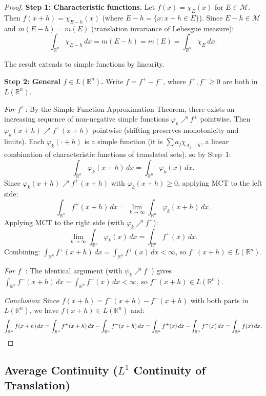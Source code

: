 \documentclass[11pt]{report}
\begin{document}
\begin{proof}
\textbf{Step 1: Characteristic functions.} Let $f(x) = \chi_E(x)$ for $E \in \mathcal{M}$. Then $f(x + h) = \chi_{E-h}(x)$ (where $E - h = \{x : x + h \in E\}$). Since $E - h \in \mathcal{M}$ and $m(E - h) = m(E)$ (translation invariance of Lebesgue measure):
\[
\int_{\mathbb{R}^n} \chi_{E-h}\,dx = m(E - h) = m(E) = \int_{\mathbb{R}^n} \chi_E\,dx.
\]

The result extends to simple functions by linearity.

\textbf{Step 2: General $f \in L(\mathbb{R}^n)$.} Write $f = f^+ - f^-$, where $f^+, f^- \geq 0$ are both in $L(\mathbb{R}^n)$.

\textit{For $f^+$}: By the Simple Function Approximation Theorem, there exists an increasing sequence of non-negative simple functions $\varphi_k \nearrow f^+$ pointwise. Then $\varphi_k(x + h) \nearrow f^+(x + h)$ pointwise (shifting preserves monotonicity and limits). Each $\varphi_k(\cdot + h)$ is a simple function (it is $\sum a_j \chi_{A_j - h}$, a linear combination of characteristic functions of translated sets), so by Step~1:
\[
\int_{\mathbb{R}^n} \varphi_k(x + h)\,dx = \int_{\mathbb{R}^n} \varphi_k(x)\,dx.
\]
Since $\varphi_k(x+h) \nearrow f^+(x+h)$ with $\varphi_k(x+h) \geq 0$, applying MCT to the left side:
\[
\int_{\mathbb{R}^n} f^+(x + h)\,dx = \lim_{k \to \infty} \int_{\mathbb{R}^n} \varphi_k(x + h)\,dx.
\]
Applying MCT to the right side (with $\varphi_k \nearrow f^+$):
\[
\lim_{k \to \infty} \int_{\mathbb{R}^n} \varphi_k(x)\,dx = \int_{\mathbb{R}^n} f^+(x)\,dx.
\]
Combining: $\int_{\mathbb{R}^n} f^+(x+h)\,dx = \int_{\mathbb{R}^n} f^+(x)\,dx < \infty$, so $f^+(x+h) \in L(\mathbb{R}^n)$.

\textit{For $f^-$}: The identical argument (with $\psi_k \nearrow f^-$) gives $\int_{\mathbb{R}^n} f^-(x+h)\,dx = \int_{\mathbb{R}^n} f^-(x)\,dx < \infty$, so $f^-(x+h) \in L(\mathbb{R}^n)$.

\textit{Conclusion}: Since $f(x+h) = f^+(x+h) - f^-(x+h)$ with both parts in $L(\mathbb{R}^n)$, we have $f(x+h) \in L(\mathbb{R}^n)$ and:
\[
\int_{\mathbb{R}^n} f(x+h)\,dx = \int_{\mathbb{R}^n} f^+(x+h)\,dx - \int_{\mathbb{R}^n} f^-(x+h)\,dx = \int_{\mathbb{R}^n} f^+(x)\,dx - \int_{\mathbb{R}^n} f^-(x)\,dx = \int_{\mathbb{R}^n} f(x)\,dx. \qedhere
\]
\end{proof}

\subsection{Average Continuity ($L^1$ Continuity of Translation)}
\end{document}
